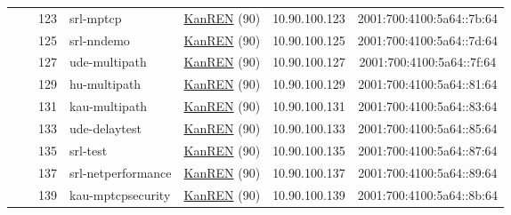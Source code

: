 \begin{small}
\begin{center}
\begin{longtable}{|c|c|c|c|c|c|c|c|}
  &  & \tiny{123} & \multicolumn{1}{|l|}{\tiny{srl-mptcp}} & \multicolumn{2}{|c|}{\tiny{\href{http://www.kanren.net}{KanREN} (90)}} & \tiny{10.90.100.123} & \tiny{2001:700:4100:5a64::7b:64} \\* \cline{3-3}\cline{4-4}\cline{5-5}\cline{6-6}\cline{7-7}\cline{8-8}
  &  & \tiny{125} & \multicolumn{1}{|l|}{\tiny{srl-nndemo}} & \multicolumn{2}{|c|}{\tiny{\href{http://www.kanren.net}{KanREN} (90)}} & \tiny{10.90.100.125} & \tiny{2001:700:4100:5a64::7d:64} \\* \cline{3-3}\cline{4-4}\cline{5-5}\cline{6-6}\cline{7-7}\cline{8-8}
  &  & \tiny{127} & \multicolumn{1}{|l|}{\tiny{ude-multipath}} & \multicolumn{2}{|c|}{\tiny{\href{http://www.kanren.net}{KanREN} (90)}} & \tiny{10.90.100.127} & \tiny{2001:700:4100:5a64::7f:64} \\* \cline{3-3}\cline{4-4}\cline{5-5}\cline{6-6}\cline{7-7}\cline{8-8}
  &  & \tiny{129} & \multicolumn{1}{|l|}{\tiny{hu-multipath}} & \multicolumn{2}{|c|}{\tiny{\href{http://www.kanren.net}{KanREN} (90)}} & \tiny{10.90.100.129} & \tiny{2001:700:4100:5a64::81:64} \\* \cline{3-3}\cline{4-4}\cline{5-5}\cline{6-6}\cline{7-7}\cline{8-8}
  &  & \tiny{131} & \multicolumn{1}{|l|}{\tiny{kau-multipath}} & \multicolumn{2}{|c|}{\tiny{\href{http://www.kanren.net}{KanREN} (90)}} & \tiny{10.90.100.131} & \tiny{2001:700:4100:5a64::83:64} \\* \cline{3-3}\cline{4-4}\cline{5-5}\cline{6-6}\cline{7-7}\cline{8-8}
  &  & \tiny{133} & \multicolumn{1}{|l|}{\tiny{ude-delaytest}} & \multicolumn{2}{|c|}{\tiny{\href{http://www.kanren.net}{KanREN} (90)}} & \tiny{10.90.100.133} & \tiny{2001:700:4100:5a64::85:64} \\* \cline{3-3}\cline{4-4}\cline{5-5}\cline{6-6}\cline{7-7}\cline{8-8}
  &  & \tiny{135} & \multicolumn{1}{|l|}{\tiny{srl-test}} & \multicolumn{2}{|c|}{\tiny{\href{http://www.kanren.net}{KanREN} (90)}} & \tiny{10.90.100.135} & \tiny{2001:700:4100:5a64::87:64} \\* \cline{3-3}\cline{4-4}\cline{5-5}\cline{6-6}\cline{7-7}\cline{8-8}
  &  & \tiny{137} & \multicolumn{1}{|l|}{\tiny{srl-netperformance}} & \multicolumn{2}{|c|}{\tiny{\href{http://www.kanren.net}{KanREN} (90)}} & \tiny{10.90.100.137} & \tiny{2001:700:4100:5a64::89:64} \\* \cline{3-3}\cline{4-4}\cline{5-5}\cline{6-6}\cline{7-7}\cline{8-8}
  &  & \tiny{139} & \multicolumn{1}{|l|}{\tiny{kau-mptcpsecurity}} & \multicolumn{2}{|c|}{\tiny{\href{http://www.kanren.net}{KanREN} (90)}} & \tiny{10.90.100.139} & \tiny{2001:700:4100:5a64::8b:64} \\* \cline{3-3}\cline{4-4}\cline{5-5}\cline{6-6}\cline{7-7}\cline{8-8}

\end{longtable}
\end{center}
\end{small}
